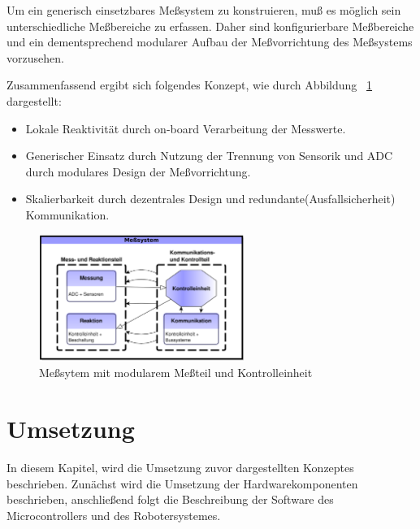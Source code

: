 \documentclass[
	11pt,								%
	a4paper,						%
	oneside,						%
	titlepage,					%
	headsepline,				%
	DIV13,							%
	abstracton,	 				%
	BCOR0cm,						%
	bibliography=totoc, %
]{scrreprt}							%
\begin{document}
Um ein generisch einsetzbares Meßsystem zu konstruieren, muß es möglich sein unterschiedliche Meßbereiche zu erfassen. Daher sind konfigurierbare Meßbereiche und 
ein dementsprechend modularer Aufbau der Meßvorrichtung des Meßsystems vorzusehen.

Zusammenfassend ergibt sich folgendes Konzept, wie durch Abbildung ~\ref{fig:schaubild2} dargestellt:

\begin{itemize}
 \item Lokale Reaktivität durch on-board Verarbeitung der Messwerte.
 
\item Generischer Einsatz durch Nutzung der Trennung von Sensorik und ADC durch modulares Design der Meßvorrichtung.

\item Skalierbarkeit durch dezentrales Design und redundante(Ausfallsicherheit) Kommunikation.
\end{itemize}

\begin{figure}[htb]
\centering
\includegraphics[width=0.6\textwidth]{images/schau3cool.png}
\caption{Meßsytem mit modularem Meßteil und Kontrolleinheit}
\label{fig:schaubild2}
\end{figure}



\chapter{Umsetzung}
\label{cha:Umsetzung}
In diesem Kapitel, wird die Umsetzung zuvor dargestellten Konzeptes beschrieben. Zunächst wird die 
Umsetzung der Hardwarekomponenten beschrieben, anschließend folgt die Beschreibung der Software des Microcontrollers und des Robotersystemes.
\end{document}
